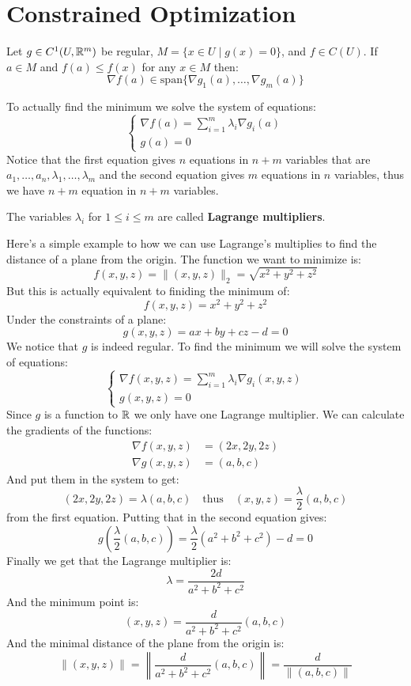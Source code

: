 \documentclass[11pt,a4paper]{article}
\begin{document}
	\newpage
	
	\section{Constrained Optimization}
	\begin{proposition}
		Let $g \in C^1(U,\mathbb{R}^m)$ be regular,
		$M = \{x \in U \mid g(x) = 0\}$, and $f \in C(U)$. If $a \in M$ and
		$f(a) \le f(x)$ for any $x \in M$ then:
		\[
			\nabla f(a) \in \mathrm{span}\{\nabla g_1(a),\dots,\nabla g_m(a)\}
		\]
	\end{proposition}
	\noindent
	To actually find the minimum we solve the system of equations:
	\[
		\begin{cases}
			\nabla f(a) = \sum_{i = 1}^{m}{\lambda_i \nabla g_i(a)} \\
			g(a) = 0
		\end{cases}
	\]
	Notice that the first equation gives $n$ equations in $n + m$ variables
	that are $a_1,\dots,a_n,\lambda_1,\dots,\lambda_m$ and the second
	equation gives $m$ equations in $n$ variables, thus we have $n + m$
	equation in $n + m$ variables.
	\begin{remark}
		The variables $\lambda_i$ for $1 \le i \le m$ are called
		\textbf{Lagrange multipliers}.
	\end{remark}
	Here's a simple example to how we can use Lagrange's multiplies to find
	the distance of a plane from the origin. The function we want to minimize
	is:
	\[
		f(x,y,z) = \|(x,y,z)\|_2 = \sqrt{x^2 + y^2 + z^2}
	\]
	But this is actually equivalent to finiding the minimum of:
	\[
		f(x,y,z) = x^2 + y^2 + z^2
	\]
	Under the constraints of a plane:
	\[
		g(x,y,z) = ax + by + cz - d = 0
	\]
	We notice that $g$ is indeed regular. To find the minimum we will solve
	the system of equations:
	\[
		\begin{cases}
			\nabla f(x,y,z) = \sum_{i = 1}^{m}{\lambda_i \nabla g_i(x,y,z)} \\
			g(x,y,z) = 0
		\end{cases}
	\]
	Since $g$ is a function to $\mathbb{R}$ we only have one Lagrange multiplier.
	We can calculate the gradients of the functions:
	\begin{align*}
		\nabla f(x,y,z) &= (2x,2y,2z) \\
		\nabla g(x,y,z) &= (a,b,c)
	\end{align*}
	And put them in the system to get:
	\[
		(2x,2y,2z) = \lambda (a,b,c) \quad\text{thus}\quad
		(x,y,z) = \frac{\lambda}{2} (a,b,c)
	\]
	from the first equation. Putting that in the second equation gives:
	\[
		g\left(\frac{\lambda}{2} (a,b,c)\right) = 
		\frac{\lambda}{2}(a^2 + b^2 + c^2) - d = 0
	\]
	Finally we get that the Lagrange multiplier is:
	\[
		\lambda = \frac{2d}{a^2 + b^2 + c^2}
	\]
	And the minimum point is:
	\[
		(x,y,z) = \frac{d}{a^2 + b^2 + c^2} (a,b,c)
	\]
	And the minimal distance of the plane from the origin is:
	\[
		\|(x,y,z)\| = \left\|\frac{d}{a^2 + b^2 + c^2} (a,b,c)\right\| = 
		\frac{d}{\|(a,b,c)\|}
	\]
	
\end{document}
